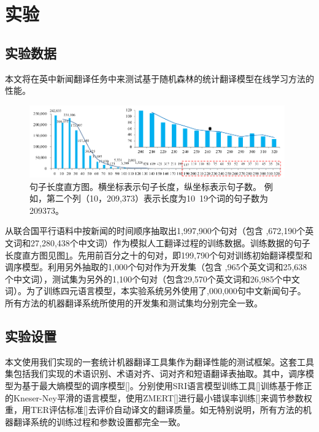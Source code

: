 \section{实验}

\subsection{实验数据}

本文将在英中新闻翻译任务中来测试基于随机森林的统计翻译模型在线学习方法的性能。

\begin{figure}[t]
	\centering
	\includegraphics[width=0.98\textwidth]{Figure/Figure_5_5.pdf}
	\caption{句子长度直方图。横坐标表示句子长度，纵坐标表示句子数。
		例如，第二个列（10，209,373）表示长度为10~19个词的句子数为209373。
	}
	\label{Fig_sent_length}
\end{figure}

从联合国平行语料中按新闻的时间顺序抽取出1,997,900个句对（包含 ,672,190个英文词和27,280,438个中文词）作为模拟人工翻译过程的训练数据。训练数据的句子长度直方图见图\ref{Fig_sent_length}。先用前百分之十的句对，即199,790个句对训练初始翻译模型和调序模型。利用另外抽取的1,000个句对作为开发集（包含 ,965个英文词和25,638个中文词），测试集为另外的1,100个句对（包含29,570个英文词和26,985个中文词）。为了训练四元语言模型，本实验系统另外使用了,000,000句中文新闻句子。所有方法的机器翻译系统所使用的开发集和测试集均分别完全一致。

\subsection{实验设置}

本文使用我们实现的一套统计机器翻译工具集作为翻译性能的测试框架。这套工具集包括我们实现的术语识别、术语对齐、词对齐和短语翻译表抽取。其中，调序模型为基于最大熵模型的调序模型[\cite{Xiong:2006}]。分别使用SRI语言模型训练工具[\cite{Stolcke:2002}]训练基于修正的Kneser-Ney平滑的语言模型，使用ZMERT[\cite{Zaidan:2009}]进行最小错误率训练[\cite{Och:2003a}]来调节参数权重，用TER评估标准[\cite{Snover:2006}]去评价自动译文的翻译质量。如无特别说明，所有方法的机器翻译系统的训练过程和参数设置都完全一致。


